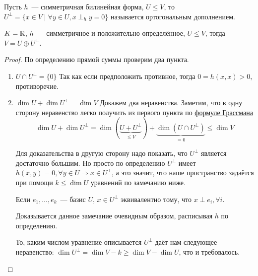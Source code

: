 \begin{definition}
    Пусть $h$~--- симметричная билинейная форма, $U\le V$, то $U^{\perp} = 
    \{x\in V \mid \forall y \in U, x\perp_h y = 0\}$ называется ортогональным дополнением.
\end{definition}
\begin{theorem}
    $K = \mathbb{R}$, $h$~--- симметричное и положительно определённое, $U \le V$,
    тогда $V = U \oplus U^{\perp}$.
\end{theorem}
\begin{proof}\leavevmode
    По определению прямой суммы проверим два пункта.
    \begin{enumerate}
        \item
        $U\cap U^{\perp} = \{0\}$
        Так как если предположить противное, тогда $0 = h(x,x) > 0$, противоречие.
        \item 
        $\dim U + \dim U^{\perp} = \dim V$
        Докажем два неравенства. Заметим, что в одну сторону неравенство легко получить
        из первого пункта по \hyperref[thm:Формула Грассмана]{формуле Грассмана} 
        \[
            \dim U + \dim U^{\perp} = \dim (\underbrace{U + U^\perp}_{\le V}) + \underbrace{\dim (U \cap U^\perp)}_{=0} \le \dim V
        \]

        Для доказательства в другую сторону надо показать, что $U^{\perp}$ является достаточно
        большим. Но просто по определению $U^\perp$ имеет $h(x, y) = 0, \forall y\in U \Rightarrow x\in U^\perp$, а это значит, что наше
        пространство задаётся при помощи $k \le \dim U$ уравнений по замечанию ниже.

        \begin{remark}
            Если $e_1,\dots, e_k$~--- базис $U$, 
            $x\in U^{\perp}$ эквивалентно тому, что $x \perp e_i, \forall i$.
        \end{remark}
        Доказывается данное замечание очевидным образом, расписывая $h$ по определению.

        То, каким числом уравнение описывается $U^\perp$ даёт нам следующее неравенство:
        $\dim U^{\perp} = \dim V - k \ge \dim V - \dim U$, что и требовалось.
    \end{enumerate}
\end{proof}
